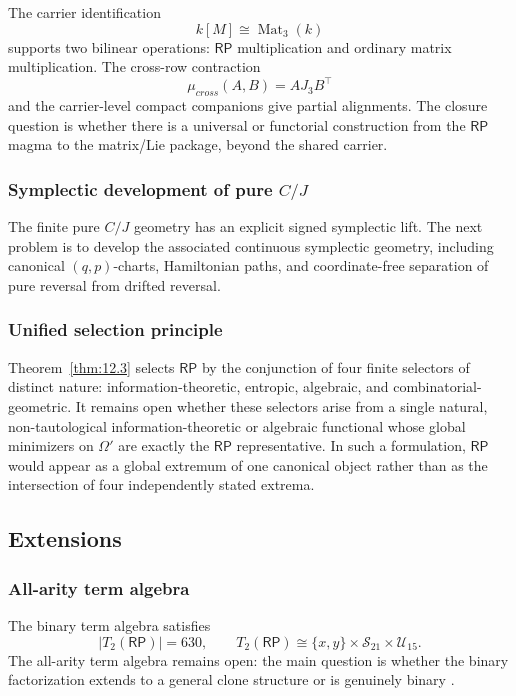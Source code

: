 \documentclass[11pt]{article}
\theoremstyle{definition}
\newcommand{\RP}{\mathsf{RP}}
\begin{document}
The carrier identification \[
k[M]\cong\operatorname{Mat}_3(k)
\] supports two bilinear operations: \(\RP\) multiplication and ordinary
matrix multiplication. The cross-row contraction \[
\mu_{cross}(A,B)=AJ_3B^\top
\] and the carrier-level compact companions give partial alignments. The
closure question is whether there is a universal or functorial
construction from the \(\RP\) magma to the matrix/Lie package, beyond the
shared carrier.

\subsubsection{\texorpdfstring{Symplectic development of pure
\(C/J\)}{Symplectic development of pure C/J}}\label{symplectic-development-of-pure-cj}

The finite pure \(C/J\) geometry has an explicit signed symplectic lift.
The next problem is to develop the associated continuous symplectic
geometry, including canonical \((q,p)\)-charts, Hamiltonian paths, and
coordinate-free separation of pure reversal from drifted reversal.

\subsubsection{Unified selection principle}\label{unified-selection-principle}

Theorem~\ref{thm:12.3} selects \(\RP\) by the conjunction of four finite
selectors of distinct nature: information-theoretic, entropic,
algebraic, and combinatorial-geometric. It remains open whether these
selectors arise from a single natural, non-tautological
information-theoretic or algebraic functional whose global minimizers on
\(\Omega'\) are exactly the \(\RP\) representative. In such a formulation,
\(\RP\) would appear as a global extremum of one canonical object rather
than as the intersection of four independently stated extrema.

\subsection{Extensions}\label{extensions}

\subsubsection{All-arity term algebra}\label{all-arity-term-algebra}

The binary term algebra satisfies \[
|T_2(\RP)|=630,
\qquad
T_2(\RP)\cong\{x,y\}\times\mathcal S_{21}\times\mathcal U_{15}.
\] The all-arity term algebra remains open: the main question is whether
the binary factorization extends to a general clone structure or is
genuinely binary \cite{Post1941,Szendrei1986,Lau2006}.
\end{document}
